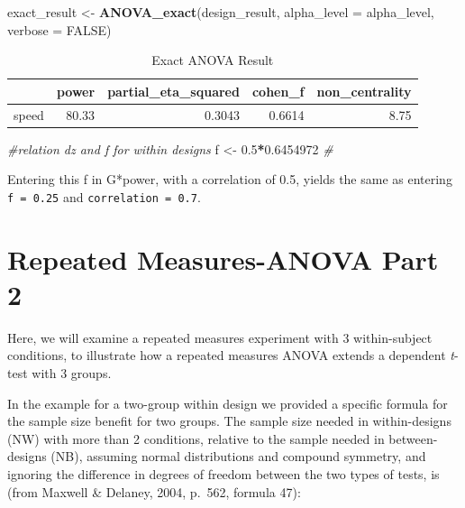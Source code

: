 \documentclass[]{book}
\newenvironment{Shaded}{\begin{snugshade}}{\end{snugshade}}
\newcommand{\CommentTok}[1]{\textcolor[rgb]{0.56,0.35,0.01}{\textit{#1}}}
\newcommand{\DataTypeTok}[1]{\textcolor[rgb]{0.13,0.29,0.53}{#1}}
\newcommand{\FloatTok}[1]{\textcolor[rgb]{0.00,0.00,0.81}{#1}}
\newcommand{\KeywordTok}[1]{\textcolor[rgb]{0.13,0.29,0.53}{\textbf{#1}}}
\newcommand{\NormalTok}[1]{#1}
\newcommand{\OperatorTok}[1]{\textcolor[rgb]{0.81,0.36,0.00}{\textbf{#1}}}
\newcommand{\OtherTok}[1]{\textcolor[rgb]{0.56,0.35,0.01}{#1}}
\newcommand{\StringTok}[1]{\textcolor[rgb]{0.31,0.60,0.02}{#1}}
\begin{document}
\begin{Shaded}
\begin{Highlighting}[]
\NormalTok{exact_result <-}\StringTok{ }\KeywordTok{ANOVA_exact}\NormalTok{(design_result,}
                            \DataTypeTok{alpha_level =}\NormalTok{ alpha_level,}
                            \DataTypeTok{verbose =} \OtherTok{FALSE}\NormalTok{)}
\end{Highlighting}
\end{Shaded}

\begin{table}[t]

\caption{\label{tab:unnamed-chunk-76}Exact ANOVA Result}
\centering
\begin{tabular}{l|r|r|r|r}
\hline
  & power & partial\_eta\_squared & cohen\_f & non\_centrality\\
\hline
speed & 80.33 & 0.3043 & 0.6614 & 8.75\\
\hline
\end{tabular}
\end{table}

\begin{Shaded}
\begin{Highlighting}[]
\CommentTok{#relation dz and f for within designs }
\NormalTok{f <-}\StringTok{ }\FloatTok{0.5}\OperatorTok{*}\FloatTok{0.6454972}
\CommentTok{#  }
\end{Highlighting}
\end{Shaded}

Entering this f in G*power, with a correlation of 0.5, yields the same as entering \texttt{f\ =\ 0.25} and \texttt{correlation\ =\ 0.7}.

\hypertarget{repeated-measures-anova-part-2}{%
\section{Repeated Measures-ANOVA Part 2}\label{repeated-measures-anova-part-2}}

Here, we will examine a repeated measures experiment with 3 within-subject conditions, to illustrate how a repeated measures ANOVA extends a dependent \emph{t}-test with 3 groups.

In the example for a two-group within design we provided a specific formula for the sample size benefit for two groups. The sample size needed in within-designs (NW) with more than 2 conditions, relative to the sample needed in between-designs (NB), assuming normal distributions and compound symmetry, and ignoring the difference in degrees of freedom between the two types of tests, is (from Maxwell \& Delaney, 2004, p.~562, formula 47):
\end{document}
